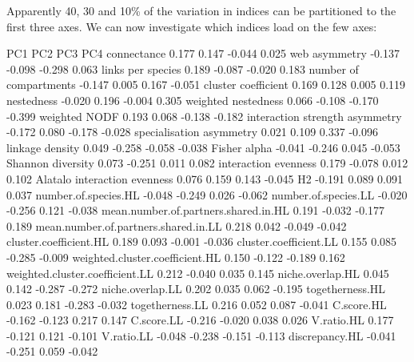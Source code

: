 \documentclass[a4paper, 11pt]{article}\usepackage[]{graphicx}\usepackage[]{color}
\begin{document}
Apparently 40, 30 and 10\% of the variation in indices can be partitioned to the first three axes. We can now investigate which indices load on the few axes:

\begin{Schunk}
\begin{Soutput}
                                        PC1    PC2    PC3    PC4
connectance                           0.177  0.147 -0.044  0.025
web asymmetry                        -0.137 -0.098 -0.298  0.063
links per species                     0.189 -0.087 -0.020  0.183
number of compartments               -0.147  0.005  0.167 -0.051
cluster coefficient                   0.169  0.128  0.005  0.119
nestedness                           -0.020  0.196 -0.004  0.305
weighted nestedness                   0.066 -0.108 -0.170 -0.399
weighted NODF                         0.193  0.068 -0.138 -0.182
interaction strength asymmetry       -0.172  0.080 -0.178 -0.028
specialisation asymmetry              0.021  0.109  0.337 -0.096
linkage density                       0.049 -0.258 -0.058 -0.038
Fisher alpha                         -0.041 -0.246  0.045 -0.053
Shannon diversity                     0.073 -0.251  0.011  0.082
interaction evenness                  0.179 -0.078  0.012  0.102
Alatalo interaction evenness          0.076  0.159  0.143 -0.045
H2                                   -0.191  0.089  0.091  0.037
number.of.species.HL                 -0.048 -0.249  0.026 -0.062
number.of.species.LL                 -0.020 -0.256  0.121 -0.038
mean.number.of.partners.shared.in.HL  0.191 -0.032 -0.177  0.189
mean.number.of.partners.shared.in.LL  0.218  0.042 -0.049 -0.042
cluster.coefficient.HL                0.189  0.093 -0.001 -0.036
cluster.coefficient.LL                0.155  0.085 -0.285 -0.009
weighted.cluster.coefficient.HL       0.150 -0.122 -0.189  0.162
weighted.cluster.coefficient.LL       0.212 -0.040  0.035  0.145
niche.overlap.HL                      0.045  0.142 -0.287 -0.272
niche.overlap.LL                      0.202  0.035  0.062 -0.195
togetherness.HL                       0.023  0.181 -0.283 -0.032
togetherness.LL                       0.216  0.052  0.087 -0.041
C.score.HL                           -0.162 -0.123  0.217  0.147
C.score.LL                           -0.216 -0.020  0.038  0.026
V.ratio.HL                            0.177 -0.121  0.121 -0.101
V.ratio.LL                           -0.048 -0.238 -0.151 -0.113
discrepancy.HL                       -0.041 -0.251  0.059 -0.042

\end{Soutput}
\end{Schunk}
\end{document}

